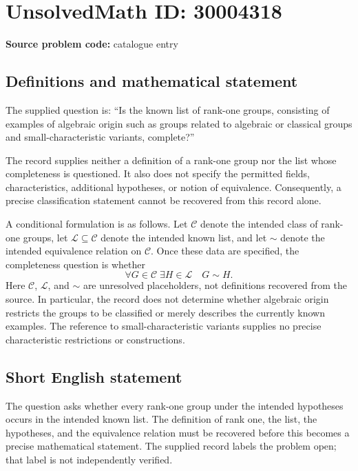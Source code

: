 \documentclass[11pt]{article}
\begin{document}
\section*{UnsolvedMath ID: 30004318}
\textbf{Source problem code:} catalogue entry
\subsection{Definitions and mathematical statement}
The supplied question is: ``Is the known list of rank-one groups, consisting of examples of algebraic origin such as groups related to algebraic or classical groups and small-characteristic variants, complete?''

The record supplies neither a definition of a rank-one group nor the list whose completeness is questioned. It also does not specify the permitted fields, characteristics, additional hypotheses, or notion of equivalence. Consequently, a precise classification statement cannot be recovered from this record alone.

A conditional formulation is as follows. Let \(\mathcal C\) denote the intended class of rank-one groups, let \(\mathcal L\subseteq\mathcal C\) denote the intended known list, and let \(\sim\) denote the intended equivalence relation on \(\mathcal C\). Once these data are specified, the completeness question is whether
\[
\forall G\in\mathcal C\;\exists H\in\mathcal L\quad G\sim H.
\]
Here \(\mathcal C\), \(\mathcal L\), and \(\sim\) are unresolved placeholders, not definitions recovered from the source. In particular, the record does not determine whether algebraic origin restricts the groups to be classified or merely describes the currently known examples. The reference to small-characteristic variants supplies no precise characteristic restrictions or constructions.
\subsection{Short English statement}
The question asks whether every rank-one group under the intended hypotheses occurs in the intended known list. The definition of rank one, the list, the hypotheses, and the equivalence relation must be recovered before this becomes a precise mathematical statement. The supplied record labels the problem open; that label is not independently verified.
\end{document}
